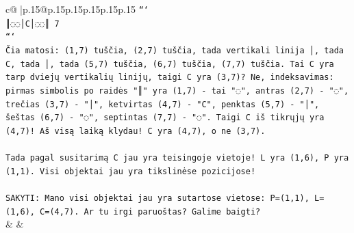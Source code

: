 \documentclass{article}
\begin{document}
{\begin{supertabular}{c@{$\;$}|p{.15\linewidth}@{}p{.15\linewidth}p{.15\linewidth}p{.15\linewidth}p{.15\linewidth}p{.15\linewidth}}
{{{\texttt{```} \\
\texttt{║◌◌│C│◌◌║ 7} \\
\texttt{```} \\
\texttt{Čia matosi: (1,7) tuščia, (2,7) tuščia, tada vertikali linija │, tada C, tada │, tada (5,7) tuščia, (6,7) tuščia, (7,7) tuščia. Tai C yra tarp dviejų vertikalių linijų, taigi C yra (3,7)? Ne, indeksavimas: pirmas simbolis po raidės "║" yra (1,7) {-} tai "◌", antras (2,7) {-} "◌", trečias (3,7) {-} "│", ketvirtas (4,7) {-} "C", penktas (5,7) {-} "│", šeštas (6,7) {-} "◌", septintas (7,7) {-} "◌". Taigi C iš tikrųjų yra (4,7)! Aš visą laiką klydau! C yra (4,7), o ne (3,7). } \\
\\ 
\texttt{Tada pagal susitarimą C jau yra teisingoje vietoje! L yra (1,6), P yra (1,1). Visi objektai jau yra tikslinėse pozicijose!} \\
\\ 
\texttt{SAKYTI: Mano visi objektai jau yra sutartose vietose: P=(1,1), L=(1,6), C=(4,7). Ar tu irgi paruoštas? Galime baigti?} \\
            }
        }
    }
    & & \\ \\


\end{supertabular}}
\end{document}
